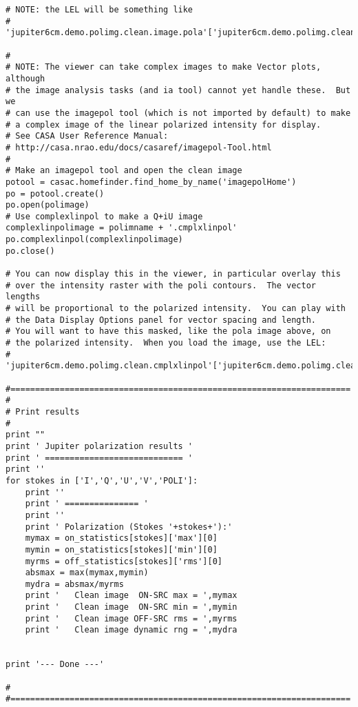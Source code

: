 \begin{verbatim}
# NOTE: the LEL will be something like
# 'jupiter6cm.demo.polimg.clean.image.pola'['jupiter6cm.demo.polimg.clean.image.poli'>0.005]

#
# NOTE: The viewer can take complex images to make Vector plots, although
# the image analysis tasks (and ia tool) cannot yet handle these.  But we
# can use the imagepol tool (which is not imported by default) to make
# a complex image of the linear polarized intensity for display.
# See CASA User Reference Manual:
# http://casa.nrao.edu/docs/casaref/imagepol-Tool.html
#
# Make an imagepol tool and open the clean image 
potool = casac.homefinder.find_home_by_name('imagepolHome')
po = potool.create()
po.open(polimage)
# Use complexlinpol to make a Q+iU image
complexlinpolimage = polimname + '.cmplxlinpol'
po.complexlinpol(complexlinpolimage)
po.close()

# You can now display this in the viewer, in particular overlay this
# over the intensity raster with the poli contours.  The vector lengths
# will be proportional to the polarized intensity.  You can play with
# the Data Display Options panel for vector spacing and length.
# You will want to have this masked, like the pola image above, on
# the polarized intensity.  When you load the image, use the LEL:
# 'jupiter6cm.demo.polimg.clean.cmplxlinpol'['jupiter6cm.demo.polimg.clean.image.poli'>0.005]

#=====================================================================
#
# Print results
#
print ""
print ' Jupiter polarization results '
print ' ============================ '
print ''
for stokes in ['I','Q','U','V','POLI']:
    print ''
    print ' =============== '
    print ''
    print ' Polarization (Stokes '+stokes+'):'
    mymax = on_statistics[stokes]['max'][0]
    mymin = on_statistics[stokes]['min'][0]
    myrms = off_statistics[stokes]['rms'][0]
    absmax = max(mymax,mymin)
    mydra = absmax/myrms
    print '   Clean image  ON-SRC max = ',mymax
    print '   Clean image  ON-SRC min = ',mymin
    print '   Clean image OFF-SRC rms = ',myrms
    print '   Clean image dynamic rng = ',mydra


print '--- Done ---'

#
#=====================================================================

\end{verbatim}
\normalsize

